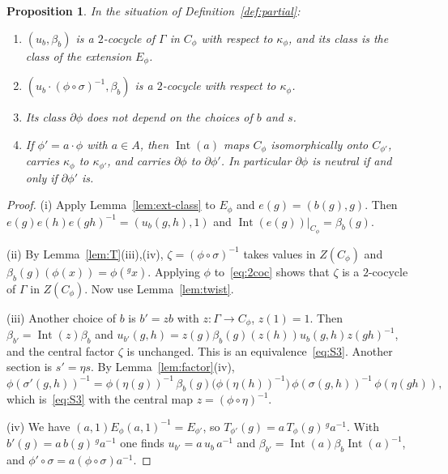 \documentclass[12pt,letterpaper]{article}
\numberwithin{equation}{section}
\theoremstyle{plain}
\newtheorem{proposition}[theorem]{Proposition}
\theoremstyle{definition}
\newcommand{\act}[2]{{}^{#1}\!#2}          %
\DeclareMathOperator{\Int}{Int}
\begin{document}
\begin{proposition}\label{prop:welldef}
In the situation of Definition~\ref{def:partial}:
\begin{enumerate}[label=\textup{(\roman*)},itemsep=1pt]
\item $(u_b,\beta_b)$ is a $2$-cocycle of $\Gamma$ in $C_\phi$ with respect
to $\kappa_\phi$, and its class is the class of the extension $E_\phi$.
\item $(u_b\cdot(\phi\circ\sigma)^{-1},\beta_b)$ is a $2$-cocycle with
respect to $\kappa_\phi$.
\item Its class $\partial\phi$ does not depend on the choices of $b$ and
$s$.
\item If $\phi'=a\cdot\phi$ with $a\in A$, then $\Int(a)$ maps $C_\phi$
isomorphically onto $C_{\phi'}$, carries $\kappa_\phi$ to $\kappa_{\phi'}$,
and carries $\partial\phi$ to $\partial\phi'$. In particular
$\partial\phi$ is neutral if and only if $\partial\phi'$ is.
\end{enumerate}
\end{proposition}

\begin{proof}
(i) Apply Lemma~\ref{lem:ext-class} to $E_\phi$ and $e(g)=(b(g),g)$. Then
$e(g)e(h)e(gh)^{-1}=(u_b(g,h),1)$ and $\Int(e(g))|_{C_\phi}=\beta_b(g)$.

(ii) By Lemma~\ref{lem:T}(iii),(iv), $\zeta=(\phi\circ\sigma)^{-1}$ takes
values in $Z(C_\phi)$ and $\beta_b(g)(\phi(x))=\phi(\act{g}{x})$. Applying
$\phi$ to~\eqref{eq:2coc} shows that $\zeta$ is a $2$-cocycle of $\Gamma$
in $Z(C_\phi)$. Now use Lemma~\ref{lem:twist}.

(iii) Another choice of $b$ is $b'=zb$ with $z:\Gamma\to C_\phi$, $z(1)=1$.
Then $\beta_{b'}=\Int(z)\beta_b$ and $u_{b'}(g,h)=z(g)\beta_b(g)(z(h))
u_b(g,h)z(gh)^{-1}$, and the central factor $\zeta$ is unchanged. This is
an equivalence~\eqref{eq:S3}. Another section is $s'=\eta s$. By
Lemma~\ref{lem:factor}(iv),
\[
\phi(\sigma'(g,h))^{-1}=\phi(\eta(g))^{-1}\,
\beta_b(g)\bigl(\phi(\eta(h))^{-1}\bigr)\,\phi(\sigma(g,h))^{-1}\,
\phi(\eta(gh)),
\]
which is~\eqref{eq:S3} with the central map $z=(\phi\circ\eta)^{-1}$.

(iv) We have $(a,1)E_\phi(a,1)^{-1}=E_{\phi'}$, so
$T_{\phi'}(g)=a\,T_\phi(g)\,\act{g}{a}^{-1}$. With
$b'(g)=a\,b(g)\,\act{g}{a}^{-1}$ one finds $u_{b'}=a\,u_b\,a^{-1}$ and
$\beta_{b'}=\Int(a)\beta_b\Int(a)^{-1}$, and
$\phi'\circ\sigma=a(\phi\circ\sigma)a^{-1}$.
\end{proof}
\end{document}
